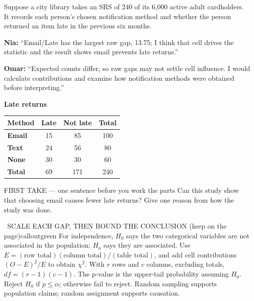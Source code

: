 \documentclass[11pt]{article}
\begin{document}
Suppose a city library takes an SRS of 240 of its 6,000 active adult cardholders. It records each person's chosen notification method and whether the person returned an item late in the previous six months.\par\smallskip \textbf{Nia:} ``Email/Late has the largest raw gap, 13.75; I think that cell drives the statistic and the result shows email prevents late returns.''\par \textbf{Omar:} ``Expected counts differ, so raw gaps may not settle cell influence. I would calculate contributions and examine how notification methods were obtained before interpreting.''\par
\begin{center}
\textbf{Late returns}\par\smallskip
\begin{tabular}{|l|c|c|c|}
\hline
\textbf{Method} & \textbf{Late} & \textbf{Not late} & \textbf{Total} \\ \hline
\textbf{Email} & 15 & 85 & 100 \\ \hline
\textbf{Text} & 24 & 56 & 80 \\ \hline
\textbf{None} & 30 & 30 & 60 \\ \hline
\textbf{Total} & 69 & 171 & 240 \\ \hline
\end{tabular}
\end{center}
\begin{firsttakebox}{FIRST TAKE --- one sentence before you work the parts}
Can this study show that choosing email causes fewer late returns? Give one reason from how the study was done.\par
{}
\end{firsttakebox}

\begin{callout}{\IconBook\ SCALE EACH GAP, THEN BOUND THE CONCLUSION (keep on the page)}{calloutgreen}
For independence, $H_0$ says the two categorical variables are not associated in the population;
$H_a$ says they are associated. Use $E=(\text{row total})(\text{column total})/(\text{table total})$,
and add cell contributions $(O-E)^2/E$ to obtain $\chi^2$.
With $r$ rows and $c$ columns, excluding totals, $df=(r-1)(c-1)$.
The p-value is the upper-tail probability assuming $H_0$. Reject $H_0$ if $p\leq\alpha$;
otherwise fail to reject. Random sampling supports population claims; random assignment supports causation.
\end{callout}
\end{document}

